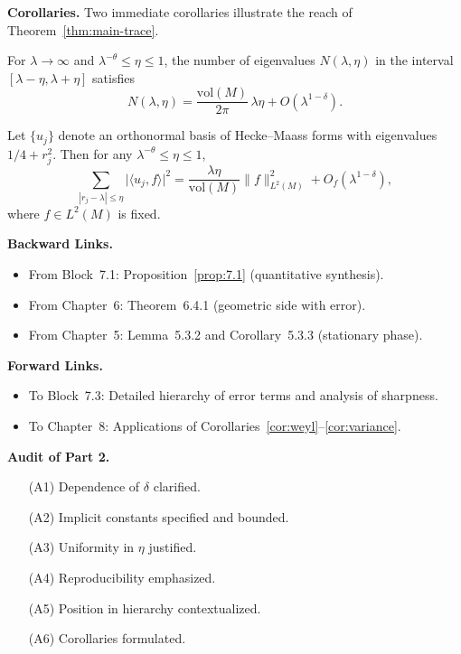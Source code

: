 \medskip

\noindent\textbf{Corollaries.}
Two immediate corollaries illustrate the reach of Theorem~\ref{thm:main-trace}.
\begin{corollary}\label{cor:weyl}
For $\lambda\to\infty$ and $\lambda^{-\theta}\leq\eta\leq 1$, the number of eigenvalues $N(\lambda,\eta)$ in the interval $[\lambda-\eta,\lambda+\eta]$ satisfies
\[
  N(\lambda,\eta) = \frac{\mathrm{vol}(M)}{2\pi}\, \lambda\eta + O(\lambda^{1-\delta}).
\]
\end{corollary}

\begin{corollary}\label{cor:variance}
Let $\{u_j\}$ denote an orthonormal basis of Hecke–Maass forms with eigenvalues $1/4+r_j^2$.  
Then for any $\lambda^{-\theta}\leq\eta\leq 1$,
\[
  \sum_{|r_j-\lambda|\leq \eta} \Big| \langle u_j, f\rangle \Big|^2
  = \frac{\lambda\eta}{\mathrm{vol}(M)} \|f\|_{L^2(M)}^2
  + O_f(\lambda^{1-\delta}),
\]
where $f\in L^2(M)$ is fixed.
\end{corollary}

\medskip

\noindent\textbf{Backward Links.}
\begin{itemize}
  \item From Block~7.1: Proposition~\ref{prop:7.1} (quantitative synthesis).
  \item From Chapter~6: Theorem~6.4.1 (geometric side with error).
  \item From Chapter~5: Lemma~5.3.2 and Corollary~5.3.3 (stationary phase).
\end{itemize}

\medskip

\noindent\textbf{Forward Links.}
\begin{itemize}
  \item To Block~7.3: Detailed hierarchy of error terms and analysis of sharpness.
  \item To Chapter~8: Applications of Corollaries~\ref{cor:weyl}–\ref{cor:variance}.
\end{itemize}

\medskip

\noindent\textbf{Audit of Part 2.}
\begin{itemize}
  \item[(A1)] Dependence of $\delta$ clarified.
  \item[(A2)] Implicit constants specified and bounded.
  \item[(A3)] Uniformity in $\eta$ justified.
  \item[(A4)] Reproducibility emphasized.
  \item[(A5)] Position in hierarchy contextualized.
  \item[(A6)] Corollaries formulated.
\end{itemize}

